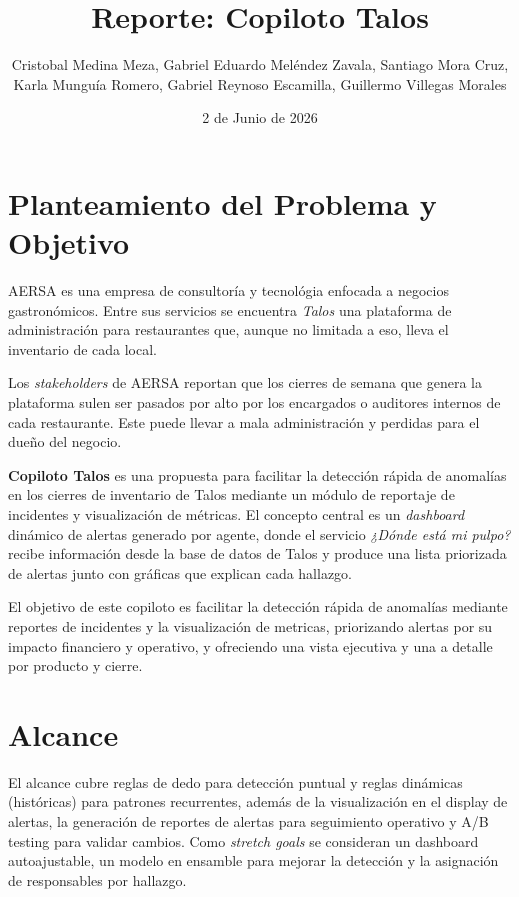 \documentclass[11pt]{article}
\title{Reporte: Copiloto Talos}
\author{Cristobal Medina Meza, Gabriel Eduardo Meléndez Zavala, Santiago Mora Cruz,\\Karla Munguía Romero, Gabriel Reynoso Escamilla, Guillermo Villegas Morales}
\date{2 de Junio de 2026}
\begin{document}
\maketitle

\section*{Planteamiento del Problema y Objetivo}
AERSA es una empresa de consultoría y tecnológia enfocada a negocios gastronómicos. Entre sus servicios se encuentra \textit{Talos} una plataforma de administración para restaurantes que, aunque no limitada a eso, lleva el inventario de cada local. 

Los \textit{stakeholders} de AERSA reportan que los cierres de semana que genera la plataforma sulen ser pasados por alto por los encargados o auditores internos de cada restaurante. Este puede llevar a mala administración y perdidas para el dueño del negocio.

\textbf{Copiloto Talos} es una propuesta para facilitar la detección rápida de anomalías en los cierres de inventario de Talos mediante un módulo de reportaje de incidentes y visualización de métricas. El concepto central es un \textit{dashboard} dinámico de alertas generado por agente, donde el servicio \textit{¿Dónde está mi pulpo?} recibe información desde la base de datos de Talos y produce una lista priorizada de alertas junto con gráficas que explican cada hallazgo.

El objetivo de este copiloto es facilitar la detección rápida de anomalías mediante reportes de incidentes y la visualización de metricas, priorizando alertas por su impacto financiero y operativo, y ofreciendo una vista ejecutiva y una a detalle por producto y cierre.

\section*{Alcance}

El alcance cubre reglas de dedo para detección puntual y reglas dinámicas (históricas) para patrones recurrentes, además de la visualización en el display de alertas, la generación de reportes de alertas para seguimiento operativo y A/B testing para validar cambios. Como \textit{stretch goals} se consideran un dashboard autoajustable, un modelo en ensamble para mejorar la detección y la asignación de responsables por hallazgo.
\end{document}
